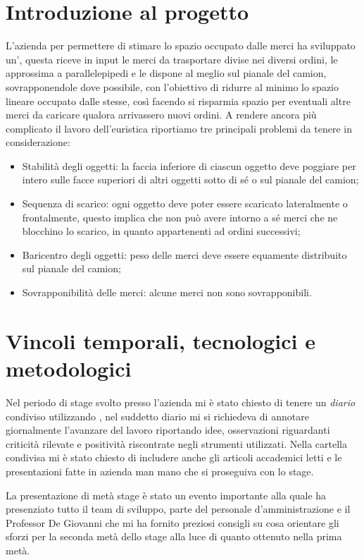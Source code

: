 \section{Introduzione al progetto}
L'azienda per permettere di stimare lo spazio occupato dalle merci ha sviluppato un', questa riceve in input le merci da trasportare divise nei diversi ordini, le approssima a parallelepipedi e le dispone al meglio sul pianale del camion, sovrapponendole dove possibile, con l'obiettivo di ridurre al minimo lo spazio lineare occupato dalle stesse, così facendo si risparmia spazio per eventuali altre merci da caricare qualora arrivassero nuovi ordini.
A rendere ancora più complicato il lavoro dell'euristica riportiamo tre principali problemi da tenere in considerazione:
\begin{itemize}
	\item Stabilità degli oggetti: la faccia inferiore di ciascun oggetto deve poggiare per intero sulle facce superiori di altri oggetti sotto di sé o sul pianale del camion;
	\item Sequenza di scarico: ogni oggetto deve poter essere scaricato lateralmente o frontalmente, questo implica che non può avere intorno a sé merci che ne blocchino lo scarico, in quanto appartenenti ad ordini successivi;
	\item Baricentro degli oggetti: peso delle merci deve essere equamente distribuito sul pianale del camion;
	\item Sovrapponibilità delle merci: alcune merci non sono sovrapponibili.
\end{itemize}

\section{Vincoli temporali, tecnologici e metodologici}
Nel periodo di stage svolto presso l'azienda mi è stato chiesto di tenere un \textit{diario} condiviso utilizzando , nel suddetto diario mi si richiedeva di annotare giornalmente l'avanzare del lavoro riportando idee, osservazioni riguardanti criticità rilevate e positività riscontrate negli strumenti utilizzati. Nella cartella condivisa mi è stato chiesto di includere anche gli articoli accademici letti e le presentazioni fatte in azienda man mano che si proseguiva con lo stage.

La presentazione di metà stage è stato un evento importante alla quale ha presenziato tutto il team di sviluppo, parte del personale d'amministrazione e il Professor De Giovanni che mi ha fornito preziosi consigli su cosa orientare gli sforzi per la seconda metà dello stage alla luce di quanto ottenuto nella prima metà.

